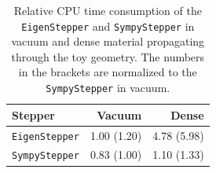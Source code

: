 \begin{table}[ht]
    \centering
    \begin{tabular}{lrr}
        \hline
        \textbf{Stepper} & \textbf{Vacuum} & \textbf{Dense} \\
        \hline
        \texttt{EigenStepper} & 1.00 (1.20) & 4.78 (5.98) \\
        \texttt{SympyStepper} & 0.83 (1.00) & 1.10 (1.33) \\
        \hline
    \end{tabular}
    \caption{Relative CPU time consumption of the \texttt{EigenStepper} and \texttt{SympyStepper} in vacuum and dense material propagating through the toy geometry. The numbers in the brackets are normalized to the \texttt{SympyStepper} in vacuum.}
    \label{tab:dev/dense/cpu-performance}
\end{table}
